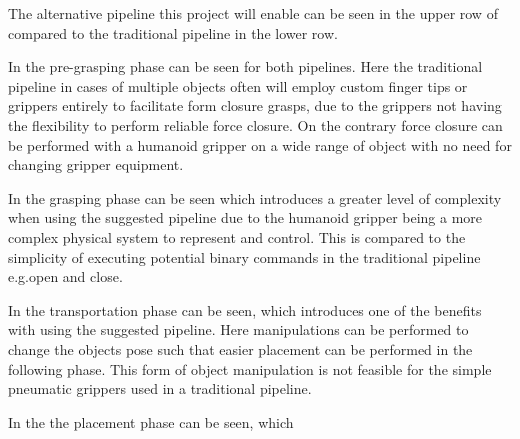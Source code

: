 The alternative pipeline this project will enable can be seen in the upper row of  compared to the traditional pipeline in the lower row.\medskip 

In  the pre-grasping phase can be seen for both pipelines. Here the traditional pipeline in cases of multiple objects often will employ custom finger tips or grippers entirely to facilitate form closure grasps, due to the grippers not having the flexibility to perform reliable force closure. On the contrary force closure can be performed with a humanoid gripper on a wide range of object with no need for changing gripper equipment. \medskip

In  the grasping phase can be seen which introduces a greater level of complexity when using the suggested pipeline due to the humanoid gripper being a more complex physical system to represent and control. This is compared to the simplicity of executing potential binary commands in the traditional pipeline e.g.open and close. \medskip

In  the transportation phase can be seen, which introduces one of the benefits with using the suggested pipeline. Here manipulations can be performed to change the objects pose such that easier placement can be performed in the following phase. This form of object manipulation is not feasible for the simple pneumatic grippers used in a traditional pipeline. \medskip

In  the the placement phase can be seen, which  \medskip


